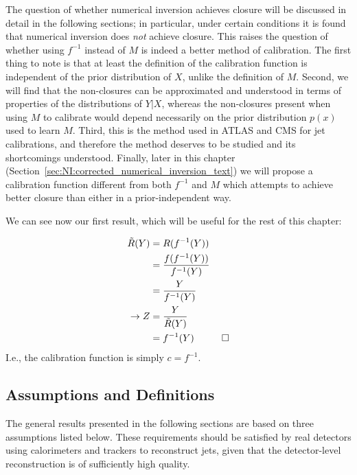 The question of whether numerical inversion achieves closure will be discussed in detail in the following sections; in particular, under certain conditions it is found that numerical inversion does \emph{not} achieve closure.
This raises the question of whether using $f^{-1}$ instead of $M$ is indeed a better method of calibration.
The first thing to note is that at least the definition of the calibration function is independent of the prior distribution of $X$, unlike the definition of $M$.
Second, we will find that the non-closures can be approximated and understood in terms of properties of the distributions of $Y|X$, whereas the non-closures present when using $M$ to calibrate would depend necessarily on the prior distribution $p(x)$ used to learn $M$.
Third, this is the method used in ATLAS and CMS for jet calibrations, and therefore the method deserves to be studied and its shortcomings understood.
Finally, later in this chapter (Section~\ref{sec:NI:corrected_numerical_inversion_text}) we will propose a calibration function different from both $f^{-1}$ and $M$ which attempts to achieve better closure than either in a prior-independent way.

We can see now our first result, which will be useful for the rest of this chapter:
\vspace{6mm}


\begin{align}
\tilde{R}(Y) &= R(f^{-1}(Y))\nonumber\\
&= \frac{f(f^{-1}(Y))}{f^{-1}(Y)}\nonumber\\
&= \frac{Y}{f^{-1}(Y)}\nonumber\\
\rightarrow Z &= \frac{Y}{\tilde{R}(Y)}\nonumber\\
&= f^{-1}(Y) \hspace{1 cm} \Box
\end{align}
I.e., the calibration function is simply $c=f^{-1}$.

\subsection{Assumptions and Definitions}
\label{sec:NI:assumptions}

The general results presented in the following sections are based on three assumptions listed below.  These requirements should be satisfied by real detectors using calorimeters and trackers to reconstruct jets, given that the detector-level reconstruction is of sufficiently high quality.


